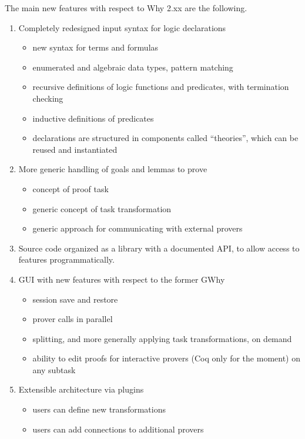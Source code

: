 \documentclass[a4paper,11pt,twoside,openright]{memoir}
\begin{document}
The main new features with respect to Why 2.xx
are the following.
\begin{enumerate}
\item Completely redesigned input syntax for logic declarations
  \begin{itemize}
  \item new syntax for terms and formulas
  \item enumerated and algebraic data types, pattern matching
  \item recursive definitions of logic functions and predicates, with
    termination checking
  \item inductive definitions of predicates
  \item declarations are structured in components called ``theories'',
    which can be reused and instantiated
  \end{itemize}

\item More generic handling of goals and lemmas to prove
  \begin{itemize}
  \item concept of proof task
  \item generic concept of task transformation
  \item generic approach for communicating with external provers
  \end{itemize}

\item Source code organized as a library with a documented API, to
  allow access to \why features programmatically.

\item GUI with new features with respect to the former GWhy
  \begin{itemize}
  \item session save and restore
  \item prover calls in parallel
  \item splitting, and more generally applying task transformations,
    on demand
  \item ability to edit proofs for interactive provers (Coq only for
    the moment) on any subtask
  \end{itemize}

\item Extensible architecture via plugins
  \begin{itemize}
  \item users can define new transformations
  \item users can add connections to additional provers
  \end{itemize}
\end{enumerate}
\end{document}
